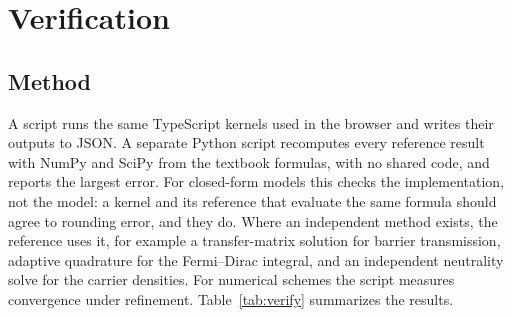 \documentclass[conference]{IEEEtran}
\begin{document}
\section{Verification}\label{sec:verification}
\subsection{Method}
A script runs the same TypeScript kernels used in the browser and writes their outputs to JSON. A separate Python script recomputes every reference result with NumPy and SciPy from the textbook formulas, with no shared code, and reports the largest error. For closed-form models this checks the implementation, not the model: a kernel and its reference that evaluate the same formula should agree to rounding error, and they do. Where an independent method exists, the reference uses it, for example a transfer-matrix solution for barrier transmission, adaptive quadrature for the Fermi--Dirac integral, and an independent neutrality solve for the carrier densities. For numerical schemes the script measures convergence under refinement. Table~\ref{tab:verify} summarizes the results.
\end{document}
